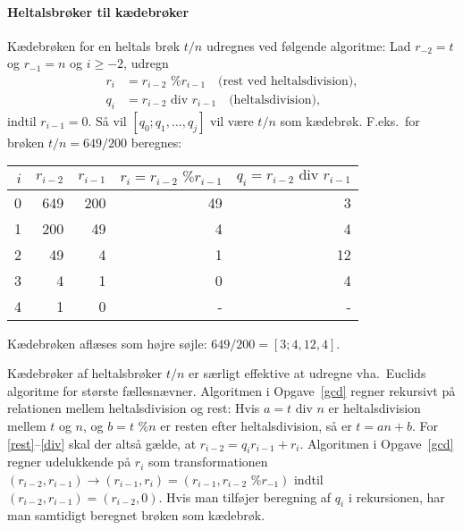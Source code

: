 \paragraph{Heltalsbrøker til kædebrøker}
Kædebrøken for en heltals brøk $t/n$ udregnes ved
følgende algoritme: Lad $r_{-2} = t$ og $r_{-1}=n$ og $i\geq-2$, udregn
\begin{align}
  r_i &= r_{i-2}\text{ \% }r_{i-1}\quad\text{(rest ved heltalsdivision)},\label{rest}
  \\q_i &= r_{i-2}\text{ div }r_{i-1}\quad\text{(heltalsdivision)},\label{div}
\end{align}
indtil $r_{i-1}=0$. Så vil $[q_0; q_1,\ldots,q_j]$ vil være $t/n$ som
kædebrøk. F.eks.\ for brøken $t/n = 649/200$ beregnes:
\begin{center}
  \begin{tabular}{|r|r|r|r|r|}
    \hline
    $i$ & $r_{i-2}$ & $r_{i-1}$ & $r_i = r_{i-2}\text{ \% }r_{i-1} $ & $q_i = r_{i-2} \text{ div } r_{i-1}$\\
    \hline
    0 & 649 & 200 & 49 & 3 \\
    1 & 200 & 49 & 4 & 4\\
    2 & 49 & 4 & 1  & 12\\
    3 & 4 & 1 & 0  & 4\\
    4 & 1 & 0 & -  & -\\
    \hline
  \end{tabular}
\end{center}
Kædebrøken aflæses som højre søjle: $649/200 = [3; 4, 12, 4]$.

Kædebrøker af heltalsbrøker $t/n$ er særligt effektive at udregne
vha.\ Euclids algoritme for største fællesnævner. Algoritmen i
Opgave~\ref{gcd} regner rekursivt på relationen mellem heltalsdivision
og rest: Hvis $a = t \text{ div } n$ er heltalsdivision mellem $t$ og
$n$, og $b = t \text{ \% } n$ er resten efter heltalsdivision, så er
$t = a n + b$. For \eqref{rest}--\eqref{div} skal der altså gælde, at
$r_{i-2} = q_i r_{i-1} + r_i$. Algoritmen i Opgave~\ref{gcd} regner
udelukkende på $r_i$ som transformationen
$(r_{i-2}, r_{i-1}) \rightarrow (r_{i-1}, r_i) = (r_{i-1},
r_{i-2}\text{ \% }r_{-1})$ indtil $(r_{i-2}, r_{i-1}) =
(r_{i-2},0)$. Hvis man tilføjer beregning af $q_i$ i rekursionen, har
man samtidigt beregnet brøken som kædebrøk.


